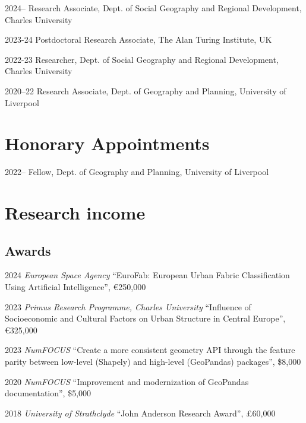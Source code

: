 \documentclass[11pt,a4paper]{report}
\begin{document}
    \begin{tablist}

        \item[2024--] \tab{}Research Associate, Dept. of Social Geography and Regional Development, Charles University

        \item[2023-24] \tab{}Postdoctoral Research Associate, The Alan Turing Institute, UK

        \item[2022-23] \tab{}Researcher, Dept. of Social Geography and Regional Development, Charles University

        \item[2020--22] \tab{}Research Associate, Dept. of Geography and Planning, University of Liverpool

    \end{tablist}


    \section*{Honorary Appointments}

    \begin{tablist}

        \item[2022--] \tab{}Fellow, Dept. of Geography and Planning, University of Liverpool
    \end{tablist}

    \section*{Research income}

    \subsection*{Awards}

    \begin{tablist}

        \item[2024] \tab{}\textit{European Space Agency} \enquote{EuroFab: European Urban Fabric Classification Using Artificial Intelligence}, €250,000
        \item[2023] \tab{}\textit{Primus Research Programme, Charles University} \enquote{Influence of Socioeconomic and Cultural Factors on Urban Structure in Central Europe}, €325,000
        \item[2023] \tab{}\textit{NumFOCUS} \enquote{Create a more consistent geometry API through the feature parity between low-level (Shapely) and high-level (GeoPandas) packages}, \$8,000
        \item[2020] \tab{}\textit{NumFOCUS} \enquote{Improvement and modernization of GeoPandas documentation}, \$5,000
        \item[2018] \tab{}\textit{University of Strathclyde} \enquote{John Anderson Research Award}, £60,000

    \end{tablist}
\end{document}
